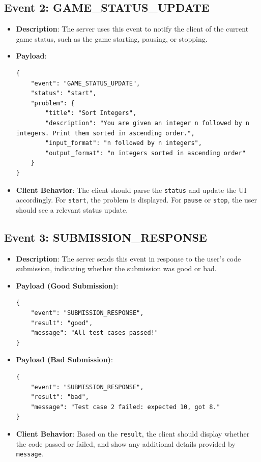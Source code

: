 \documentclass{article}
\begin{document}
\subsection{Event 2: GAME\_STATUS\_UPDATE}
\begin{itemize}
    \item \textbf{Description}: The server uses this event to notify the client of the current game status, such as the game starting, pausing, or stopping.
    \item \textbf{Payload}:
        \begin{verbatim}
{
    "event": "GAME_STATUS_UPDATE",
    "status": "start",
    "problem": {
        "title": "Sort Integers",
        "description": "You are given an integer n followed by n integers. Print them sorted in ascending order.",
        "input_format": "n followed by n integers",
        "output_format": "n integers sorted in ascending order"
    }
}
        \end{verbatim}
    \item \textbf{Client Behavior}: The client should parse the \texttt{status} and update the UI accordingly. For \texttt{start}, the problem is displayed. For \texttt{pause} or \texttt{stop}, the user should see a relevant status update.
\end{itemize}

\subsection{Event 3: SUBMISSION\_RESPONSE}
\begin{itemize}
    \item \textbf{Description}: The server sends this event in response to the user’s code submission, indicating whether the submission was good or bad.
    \item \textbf{Payload (Good Submission)}:
        \begin{verbatim}
{
    "event": "SUBMISSION_RESPONSE",
    "result": "good",
    "message": "All test cases passed!"
}
        \end{verbatim}
    \item \textbf{Payload (Bad Submission)}:
        \begin{verbatim}
{
    "event": "SUBMISSION_RESPONSE",
    "result": "bad",
    "message": "Test case 2 failed: expected 10, got 8."
}
        \end{verbatim}
    \item \textbf{Client Behavior}: Based on the \texttt{result}, the client should display whether the code passed or failed, and show any additional details provided by \texttt{message}.
\end{itemize}
\end{document}
